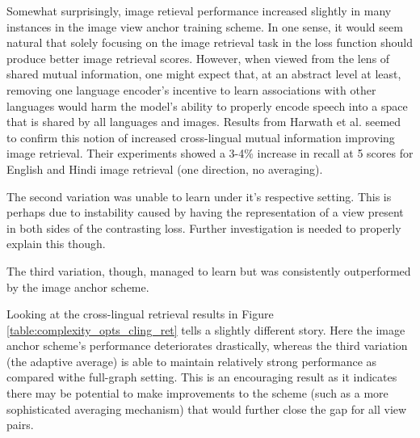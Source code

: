 Somewhat surprisingly, image retieval performance increased slightly in many instances in the image view anchor training scheme.
In one sense, it would seem natural that solely focusing on the image retrieval task in the loss function should produce better image retrieval scores.
However, when viewed from the lens of shared mutual information, one might expect that, at an abstract level at least, removing one language encoder's incentive to learn associations with other languages would harm the model's ability to properly encode speech into a space that is shared by all languages and images.
Results from Harwath et al. \cite{harwath2018interlingua} seemed to confirm this notion of increased cross-lingual mutual information improving image retrieval.
Their experiments showed a 3-4\% increase in recall at 5 scores for English and Hindi image retrieval (one direction, no averaging).
% 

The second variation was unable to learn under it's respective setting.
This is perhaps due to instability caused by having the representation of a view present in both sides of the contrasting loss.
Further investigation is needed to properly explain this though.

The third variation, though, managed to learn but was consistently outperformed by the image anchor scheme.

Looking at the cross-lingual retrieval results in Figure \ref{table:complexity_opts_cling_ret} tells a slightly different story.
Here the image anchor scheme's performance deteriorates drastically, whereas the third variation (the adaptive average) is able to maintain relatively strong performance as compared withe full-graph setting.
This is an encouraging result as it indicates there may be potential to make improvements to the scheme (such as a more sophisticated averaging mechanism) that would further close the gap for all view pairs.




